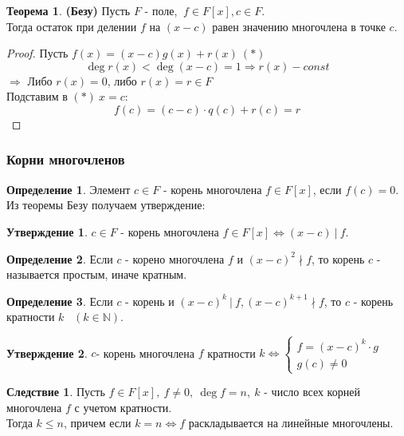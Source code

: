\documentclass[a4paper, 12pt]{article}
\newcommand{\N}{\mathbb N}
\theoremstyle{definition}
\newtheorem*{definition}{Определение}
\newtheorem*{theorem}{Теорема}
\newtheorem*{consequense}{Следствие}
\newtheorem*{subtheorem}{Утверждение}
\begin{document}
  \begin{theorem}\textbf{(Безу)} 
    Пусть $F$ - поле, $ \ f \in F[x], c \in F$.\\
    Тогда остаток при делении $f$ на $(x-c)$ равен значению многочлена в точке $c$.     
  \end{theorem}
  \begin{proof}
    Пусть $f(x) = (x-c)g(x) + r(x)\  (*)$
    $$\deg r(x) < \deg (x-c) = 1 \Longrightarrow  r(x) - const$$
    $\Longrightarrow $ Либо $r(x) = 0$, либо $r(x)=r \in F$\\
    Подставим в $(*) \ x = c$:
    $$f(c) = (c-c)\cdot q(c) + r(c) = r$$
  \end{proof}   
  \subsubsection{Корни многочленов}
  \begin{definition}
    Элемент $c\in F$ - корень многочлена $f \in F[x]$, если $f(c) = 0$. Из теоремы Безу получаем утверждение: 
  \end{definition}
  \begin{subtheorem}
    $c \in F$ - корень многочлена $f\in F[x] \Longleftrightarrow (x-c) \ | \ f$.  
  \end{subtheorem}  
  \begin{definition}
    Если $c$ - корено многочлена $f$ и $(x-c)^2 \nmid f$, то корень $c$ - называется простым, иначе кратным.
  \end{definition} 
  \begin{definition}
    Если $c$ - корень и $(x-c)^k \ | \ f, (x-c)^{k+1} \nmid f$, то $c$ - корень кратности $k$ \ $(k \in \N)$.     
  \end{definition} 
  \begin{subtheorem}
    $c$- корень многочлена $f$ кратности $k \Longleftrightarrow \begin{cases}
      f = (x-c)^k \cdot g\\
      g(c) \neq 0
    \end{cases}$  
  \end{subtheorem} 
  \begin{consequense}
    Пусть $f \in F[x], \ f \neq 0, \ \deg f = n, \ k$ - число всех корней многочлена $f$ с учетом кратности. \\
    Тогда $k\leq n$, причем если $k=n \Longleftrightarrow f$ раскладывается на линейные многочлены.    
  \end{consequense}
\end{document}
